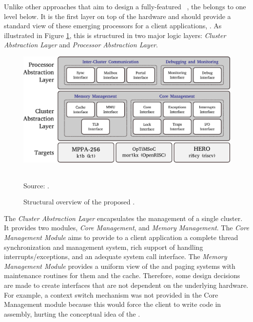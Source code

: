 		Unlike other approaches that aim to design a fully-featured \os~\cite{Baumann2009,kluge2014,nightingale2009,rhoden2011},
		the \hal belongs to one level below.
		It is the first layer on top of the hardware and should provide a standard
		view of these emerging processors for a client applications, \eg \os.
		As illustrated in Figure \ref{fig.hal-struct}, this \hal is structured in
		two major logic layers: \textit{Cluster Abstraction Layer} and \textit{Processor Abstraction Layer}.

		\begin{figure}[t]
			\centering
			\caption{Structural overview of the proposed \hal.}

			\includegraphics[width=.9\textwidth]{images/hal-struct.pdf}

			\\ \vspace{0.2cm}
			Source: \cite{penna:compas19}.

		\label{fig.hal-struct}
		\end{figure}

		The \textit{Cluster Abstraction Layer} encapsulates the management of a single cluster.
		It provides two modules, \textit{Core Management}, and \textit{Memory Management}.
		The \textit{Core Management Module} aims to provide to a client application a complete
		thread synchronization and management system, rich support of handling
		interrupts/exceptions, and an adequate system call interface.
		The \textit{Memory Management Module} provides a uniform view of the \tlbs
		and paging systems with maintenance routines for them and the cache.
		Therefore, some design decisions are made to create interfaces that are not
		dependent on the underlying hardware.
		For example, a context switch mechanism was not provided in the
		Core Management module because this would force the client \os
		to write code in assembly, hurting the conceptual idea of the \hal.

